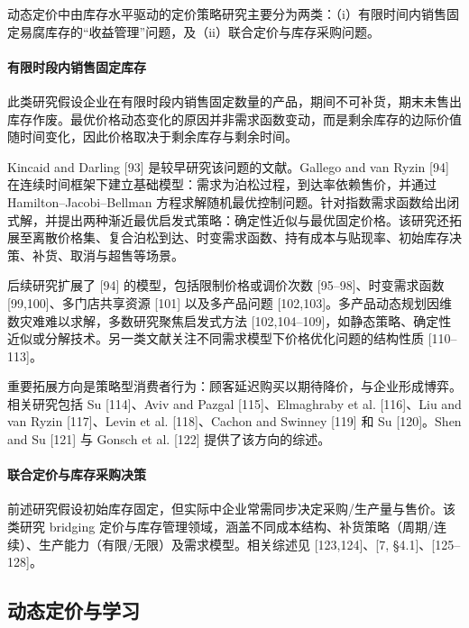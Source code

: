 动态定价中由库存水平驱动的定价策略研究主要分为两类：（i）有限时间内销售固定易腐库存的“收益管理”问题，及（ii）联合定价与库存采购问题。

\paragraph{有限时段内销售固定库存}\label{selling-a-fixed-finite-inventory-during-a-finite-time-period}

此类研究假设企业在有限时段内销售固定数量的产品，期间不可补货，期末未售出库存作废。最优价格动态变化的原因并非需求函数变动，而是剩余库存的边际价值随时间变化，因此价格取决于剩余库存与剩余时间。

Kincaid and Darling [93] 是较早研究该问题的文献。Gallego and van Ryzin [94] 在连续时间框架下建立基础模型：需求为泊松过程，到达率依赖售价，并通过 Hamilton–Jacobi–Bellman 方程求解随机最优控制问题。针对指数需求函数给出闭式解，并提出两种渐近最优启发式策略：确定性近似与最优固定价格。该研究还拓展至离散价格集、复合泊松到达、时变需求函数、持有成本与贴现率、初始库存决策、补货、取消与超售等场景。

后续研究扩展了 [94] 的模型，包括限制价格或调价次数 [95–98]、时变需求函数 [99,100]、多门店共享资源 [101] 以及多产品问题 [102,103]。多产品动态规划因维数灾难难以求解，多数研究聚焦启发式方法 [102,104–109]，如静态策略、确定性近似或分解技术。另一类文献关注不同需求模型下价格优化问题的结构性质 [110–113]。

重要拓展方向是策略型消费者行为：顾客延迟购买以期待降价，与企业形成博弈。相关研究包括 Su [114]、Aviv and Pazgal [115]、Elmaghraby et al. [116]、Liu and van Ryzin [117]、Levin et al. [118]、Cachon and Swinney [119] 和 Su [120]。Shen and Su [121] 与 Gonsch et al. [122] 提供了该方向的综述。

\paragraph{联合定价与库存采购决策}\label{jointly-determining-selling-prices-and-inventory-procurement}

前述研究假设初始库存固定，但实际中企业常需同步决定采购/生产量与售价。该类研究 bridging 定价与库存管理领域，涵盖不同成本结构、补货策略（周期/连续）、生产能力（有限/无限）及需求模型。相关综述见 [123,124]、[7, §4.1]、[125–128]。


\subsection{动态定价与学习}\label{dynamic-pricing-and-learning}

